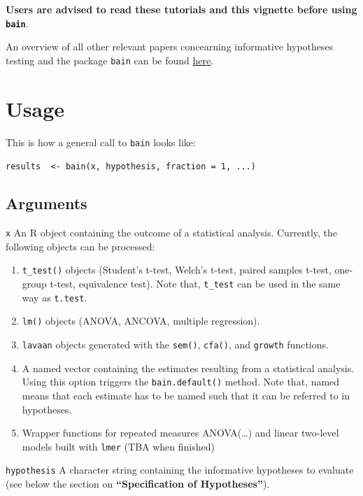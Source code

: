 \documentclass[
]{book}
\providecommand{\tightlist}{%
  \setlength{\itemsep}{0pt}\setlength{\parskip}{0pt}}
\begin{document}
\textbf{Users are
advised to read these tutorials and this vignette before using \texttt{bain}}.

An overview of all other relevant papers concearning informative hypotheses testing and the package \texttt{bain} can be found \href{https://informative-hypotheses.sites.uu.nl/publications/}{here}.

\hypertarget{usage}{%
\section{Usage}\label{usage}}

This is how a general call to \texttt{bain} looks like:

\texttt{results\ \ \textless{}-\ bain(x,\ hypothesis,\ fraction\ =\ 1,\ ...)}

\hypertarget{arguments}{%
\subsection{Arguments}\label{arguments}}

\texttt{x}
An R object containing the outcome of a statistical analysis. Currently, the following objects can be processed:

\begin{enumerate}
\def\labelenumi{\arabic{enumi})}
\tightlist
\item
  \texttt{t\_test()} objects (Student's t-test, Welch's t-test, paired samples t-test, one-group t-test, equivalence test). Note that, \texttt{t\_test} can be used in the same way as \texttt{t.test}.
\item
  \texttt{lm()} objects (ANOVA, ANCOVA, multiple regression).
\item
  \texttt{lavaan} objects generated with the \texttt{sem()}, \texttt{cfa()}, and
  \texttt{growth} functions.
\item
  A named vector containing the estimates resulting from a statistical analysis. Using this option triggers the \texttt{bain.default()} method. Note that, named means that each estimate has to be named such that it can be referred to in hypotheses.
\item
  Wrapper functions for repeated measures ANOVA(\ldots) and linear two-level models built with \texttt{lmer} (TBA when finished)
\end{enumerate}

\texttt{hypothesis} A character string containing the informative hypotheses to evaluate
(see below the section on \textbf{``Specification of Hypotheses''}).
\end{document}
